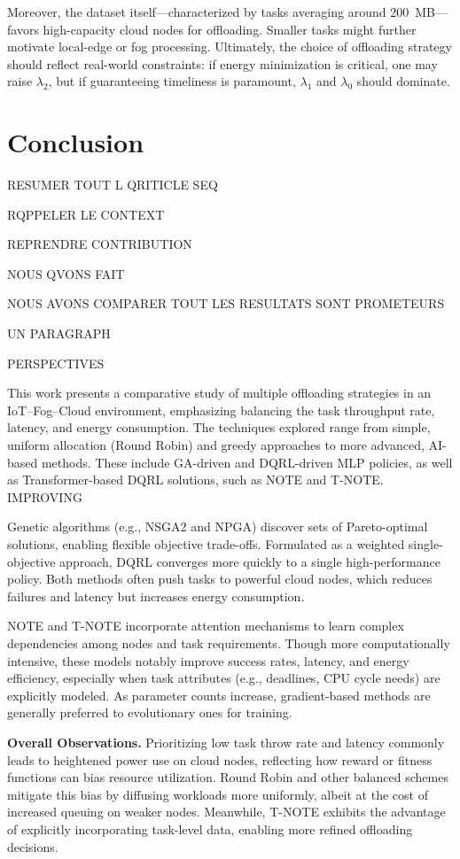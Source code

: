 \documentclass[preprint,12pt]{elsarticle}
\begin{document}
Moreover, the dataset itself—characterized by tasks averaging around 200~MB—favors high-capacity cloud nodes for offloading. Smaller tasks might further motivate local-edge or fog processing. Ultimately, the choice of offloading strategy should reflect real-world constraints: if energy minimization is critical, one may raise \(\lambda_2\), but if guaranteeing timeliness is paramount, \(\lambda_1\) and \(\lambda_0\) should dominate.

\section{Conclusion}
\label{sec:conclusion}


RESUMER TOUT L QRITICLE SEQ

RQPPELER LE CONTEXT

REPRENDRE CONTRIBUTION

NOUS QVONS FAIT 

NOUS AVONS COMPARER TOUT LES RESULTATS SONT PROMETEURS

UN PARAGRAPH 

PERSPECTIVES

This work presents a comparative study of multiple offloading strategies in an IoT–Fog–Cloud environment, emphasizing balancing the task throughput rate, latency, and energy consumption. The techniques explored range from simple, uniform allocation (Round Robin) and greedy approaches to more advanced, AI-based methods. These include GA-driven and DQRL-driven MLP policies, as well as Transformer-based DQRL solutions, such as NOTE and T-NOTE. IMPROVING 

Genetic algorithms (e.g., NSGA2 and NPGA) discover sets of Pareto-optimal solutions, enabling flexible objective trade-offs. Formulated as a weighted single-objective approach, DQRL converges more quickly to a single high-performance policy. Both methods often push tasks to powerful cloud nodes, which reduces failures and latency but increases energy consumption.

NOTE and T-NOTE incorporate attention mechanisms to learn complex dependencies among nodes and task requirements. Though more computationally intensive, these models notably improve success rates, latency, and energy efficiency, especially when task attributes (e.g., deadlines, CPU cycle needs) are explicitly modeled. As parameter counts increase, gradient-based methods are generally preferred to evolutionary ones for training.


\noindent\textbf{Overall Observations.}
Prioritizing low task throw rate and latency commonly leads to heightened power use on cloud nodes, reflecting how reward or fitness functions can bias resource utilization. Round Robin and other balanced schemes mitigate this bias by diffusing workloads more uniformly, albeit at the cost of increased queuing on weaker nodes. Meanwhile, T-NOTE exhibits the advantage of explicitly incorporating task-level data, enabling more refined offloading decisions.
\end{document}
